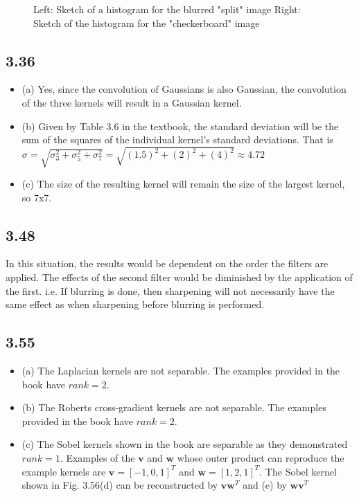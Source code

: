 \documentclass{article}[12 pt]
\begin{document}
\begin{figure}[h!]
\captionsetup[subfloat]{labelformat=empty}
\centering
{}
\caption{Left: Sketch of a histogram for the blurred "split" image Right: Sketch of the histogram for the "checkerboard" image}
\end{figure}

\subsection*{3.36}
\begin{itemize}
\item (a) Yes, since the convolution of Gaussians is also Gaussian, the convolution of the three kernels will result in a Gaussian kernel. 

\item (b)  Given by Table 3.6 in the textbook, the standard deviation will be the sum of the squares of the individual kernel's standard deviations.  That is $\sigma = \sqrt{\sigma_{3}^{2}+\sigma_{5}^{2} + \sigma_{7}^{2}} = \sqrt{(1.5)^{2}+(2)^{2} + (4)^{2}} \approx 4.72 $

\item (c) The size of the resulting kernel will remain the size of the largest kernel, so 7x7.
\end{itemize}


\subsection*{3.48}
In this situation, the results would be dependent on the order the filters are applied. The effects of the second filter would be diminished by the application of the first.  i.e. If blurring is done, then sharpening will not necessarily have the same effect as when sharpening before blurring is performed.


\subsection*{3.55}
\begin{itemize}
\item (a) The Laplacian kernels are not separable.  The examples provided in the book have $rank=2$.

\item (b)  The Roberts cross-gradient kernels are not separable.  The examples provided in the book have $rank=2$.

\item (c) The Sobel kernels shown in the book are separable as they demonstrated $rank=1$.  Examples of the $\bm{v}$ and $\bm{w}$ whose outer product can reproduce the example kernels are $\bm{v} = [-1, 0, 1]^T$ and $\bm{w} = [1, 2, 1]^T$.  The Sobel kernel shown in Fig. 3.56(d) can be reconstructed by $\bm{v}\bm{w}^T$ and (e) by $\bm{w}\bm{v}^T$
\end{itemize}
\end{document}
